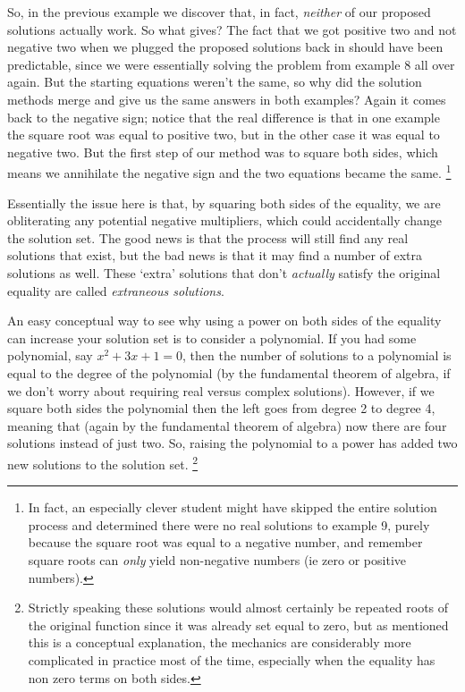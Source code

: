     So, in the previous example we discover that, in fact, \textit{neither} of our proposed solutions actually work. So what gives? The fact that we got positive two and not negative two when we plugged the proposed solutions back in should have been predictable, since we were essentially solving the problem from example 8 all over again. But the starting equations weren't the same, so why did the solution methods merge and give us the same answers in both examples? Again it comes back to the negative sign; notice that the real difference is that in one example the square root was equal to positive two, but in the other case it was equal to negative two. But the first step of our method was to square both sides, which means we annihilate the negative sign and the two equations became the same.%
    \footnote{In fact, an especially clever student might have skipped the entire solution process and determined there were no real solutions to example 9, purely because the square root was equal to a negative number, and remember square roots can \textit{only} yield non-negative numbers (ie zero or positive numbers).}

    Essentially the issue here is that, by squaring both sides of the equality, we are obliterating any potential negative multipliers, which could accidentally change the solution set. The good news is that the process will still find any real solutions that exist, but the bad news is that it may find a number of extra solutions as well. These `extra' solutions that don't \textit{actually} satisfy the original equality are called \textit{extraneous solutions}.

    An easy conceptual way to see why using a power on both sides of the equality can increase your solution set is to consider a polynomial. If you had some polynomial, say $x^2 + 3x + 1 = 0$, then the number of solutions to a polynomial is equal to the degree of the polynomial (by the fundamental theorem of algebra, if we don't worry about requiring real versus complex solutions). However, if we square both sides the polynomial then the left goes from degree 2 to degree 4, meaning that (again by the fundamental theorem of algebra) now there are four solutions instead of just two. So, raising the polynomial to a power has added two new solutions to the solution set.%
    \footnote{Strictly speaking these solutions would almost certainly be repeated roots of the original function since it was already set equal to zero, but as mentioned this is a conceptual explanation, the mechanics are considerably more complicated in practice most of the time, especially when the equality has non zero terms on both sides.}


